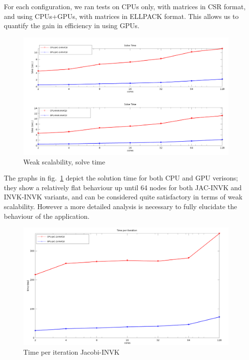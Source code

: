 For each configuration, we ran tests on CPUs only, with matrices in
CSR format, and using CPUs+GPUs, with matrices in ELLPACK format. This
allows us to quantify the gain in efficiency in using GPUs.   



\begin{figure}
\begin{center}
\includegraphics[width=.9\textwidth]{graf_solve_1.png}
\end{center}
\caption{Weak scalability, solve time\label{fig:solve_time}}
\end{figure}
The graphs in fig.~\ref{fig:solve_time} depict the solution time for
both CPU and GPU verisons; they show a relatively flat 
behaviour up until 64 nodes for both JAC-INVK and INVK-INVK variants,
and can be considered quite satisfactory in terms of weak scalability.
However a more detailed analysis is necessary to fully elucidate the
behaviour of the application. 

\begin{figure}[h!]
\centering
\includegraphics[width=1\textwidth]{graf_time_per_it3a.png}
\caption{Time per iteration Jacobi-INVK\label{fig:time_per_it_a}}
\end{figure}

